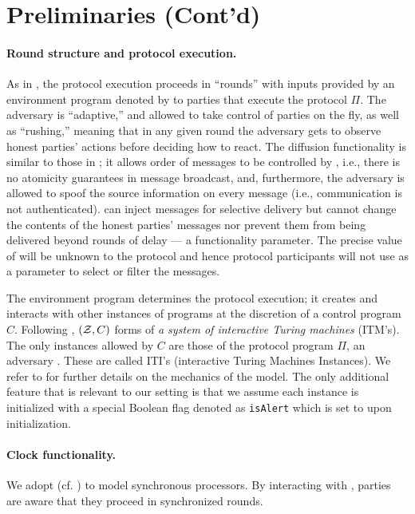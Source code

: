 \section{Preliminaries (Cont'd)}
\label{sec:preliminaries-contd}

\paragraph{Round structure and protocol execution.}
%
As in \cite{EC:GarKiaLeo15,EC:PasSeeash17}, the protocol execution proceeds in ``rounds'' with inputs provided by an environment program denoted by \Z to parties that execute the protocol $\Pi$.
%
The adversary \adv is ``adaptive,'' and allowed to take control of parties on the fly, as well as ``rushing,'' meaning that in any given round the adversary gets to observe honest parties' actions before deciding how to react.
%
The diffusion functionality is similar to those in \cite{EC:GarKiaLeo15,EC:PasSeeash17}; it allows order of messages to be controlled by \adv, i.e., there is no atomicity guarantees in message broadcast, and, furthermore, the adversary is allowed to spoof the source information on every message (i.e., communication is not authenticated).
%
\adv can inject messages for selective delivery but cannot change the contents of the honest parties' messages nor prevent them from being delivered beyond \delay rounds of delay — a functionality parameter.
%
The precise value of \delay will be unknown to the protocol and hence protocol participants will not use \delay as a parameter to select or filter the messages.

The environment program \Z determines the protocol execution; it creates and interacts with other instances of programs at the discretion of a control program $C$.
%
Following \cite{EPRINT:Canetti00}, $(\mathcal{Z}, C)$ forms of \emph{a system of interactive Turing machines} (ITM's).
%
The only instances allowed by $C$ are those of the protocol program $\Pi$, an adversary \adv.
%
These are called ITI's (interactive Turing Machines Instances).
%
We refer to \cite{EPRINT:Canetti00} for further details on the mechanics of the model.
%
The only additional feature that is relevant to our setting is that we assume each instance is initialized with a special Boolean flag denoted as \texttt{isAlert} which is set to \false upon initialization.

\paragraph{Clock functionality.}
%
We adopt \funcClock (cf. \cite{TCC:KMTZ13}) to model synchronous processors.
%
By interacting with \funcClock, parties are aware that they proceed in synchronized rounds.

